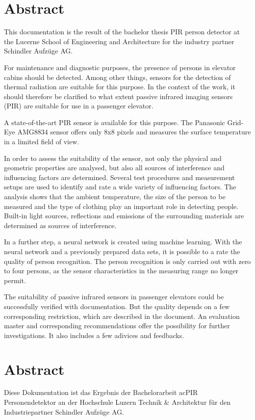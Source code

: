 \chapter*{Abstract}
\label{chap:abstract_englisch}
This documentation is the result of the bachelor thesis PIR person detector at the Lucerne School of Engineering and Architecture for the industry partner Schindler Aufzüge AG.

For maintenance and diagnostic purposes, the presence of persons in elevator cabins should be detected. Among other things, sensors for the detection of thermal radiation are suitable for this purpose. In the context of the work, it should therefore be clarified to what extent passive infrared imaging sensors (PIR) are suitable for use in a passenger elevator. 

A state-of-the-art PIR sensor is available for this purpose. The Panasonic Grid-Eye AMG8834 sensor offers only 8x8 pixels and measures the surface temperature in a limited field of view.  

In order to assess the suitability of the sensor, not only the physical and geometric properties are analysed, but also all sources of interference and influencing factors are determined. Several test procedures and measurement setups are used to identify and rate a wide variety of influencing factors. The analysis shows that the ambient temperature, the size of the person to be measured and the type of clothing play an important role in detecting people. Built-in light sources, reflections and emissions of the surrounding materials are determined as sources of interference.  

In a further step, a neural network is created using machine learning. With the  neural network and a previously prepared data sets, it is possible to a rate the quality of person recognition. The person recognition is only carried out with zero to four persons, as the sensor characteristics in the measuring range no longer permit. 

The suitability of passive infrared sensors in passenger elevators could be successfully verified with documentation. But the quality depends on a few corresponding restriction, which are described in the document. An evaluation master and corresponding recommendations offer the possibility for further investigations. It also includes a few adivices and feedbacks. 


\chapter*{Abstract}
\label{chap:abstract_german}
Diese Dokumentation ist das Ergebnis der Bachelorarbeit ac{PIR} Personendetektor an der Hochschule Luzern Technik \& Architektur für den Industriepartner Schindler Aufzüge AG. 

